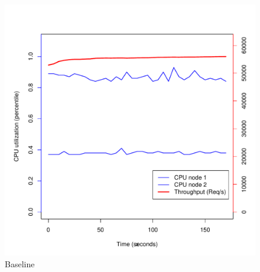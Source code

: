 

\begin{figure}[h]
    \centering
    \includegraphics[width=1.2\textwidth]{results/baseline_plot}
    \caption{Baseline}
    \label{fig:baseline}
\end{figure}


